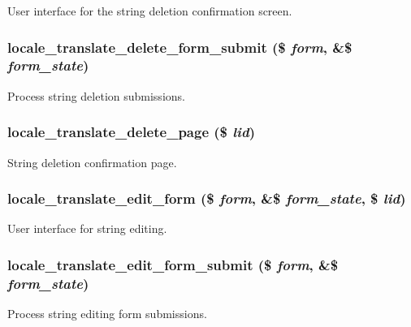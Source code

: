 \label{group__locale_gaf40a5c539ee94ae8b089275bf74e1bfe}
User interface for the string deletion confirmation screen. \hypertarget{group__locale_ga26d7aa049b06d9de384175698f5761c7}{
\subsubsection[{locale\_\-translate\_\-delete\_\-form\_\-submit}]{\setlength{\rightskip}{0pt plus 5cm}locale\_\-translate\_\-delete\_\-form\_\-submit (\$ {\em form}, \/  \&\$ {\em form\_\-state})}}
\label{group__locale_ga26d7aa049b06d9de384175698f5761c7}
Process string deletion submissions. \hypertarget{group__locale_gade9664489526c09d68def1897631f4fa}{
\subsubsection[{locale\_\-translate\_\-delete\_\-page}]{\setlength{\rightskip}{0pt plus 5cm}locale\_\-translate\_\-delete\_\-page (\$ {\em lid})}}
\label{group__locale_gade9664489526c09d68def1897631f4fa}
String deletion confirmation page. \hypertarget{group__locale_ga438cdd0b99e54bd87cd7058c6037db0e}{
\subsubsection[{locale\_\-translate\_\-edit\_\-form}]{\setlength{\rightskip}{0pt plus 5cm}locale\_\-translate\_\-edit\_\-form (\$ {\em form}, \/  \&\$ {\em form\_\-state}, \/  \$ {\em lid})}}
\label{group__locale_ga438cdd0b99e54bd87cd7058c6037db0e}
User interface for string editing. \hypertarget{group__locale_gadbeab4019dcbf389a12af893cdaad5d5}{
\subsubsection[{locale\_\-translate\_\-edit\_\-form\_\-submit}]{\setlength{\rightskip}{0pt plus 5cm}locale\_\-translate\_\-edit\_\-form\_\-submit (\$ {\em form}, \/  \&\$ {\em form\_\-state})}}
\label{group__locale_gadbeab4019dcbf389a12af893cdaad5d5}
Process string editing form submissions.

